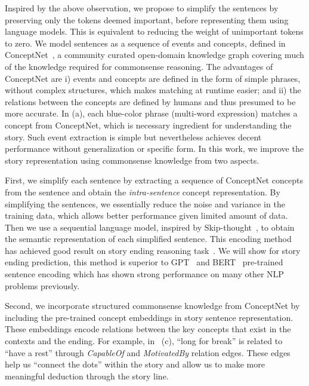 Inspired by the above observation, we propose to simplify the sentences
by preserving only the tokens deemed important, before representing them using
language models. This is equivalent to reducing the weight of unimportant tokens
to zero. 
We model sentences as a sequence of events and concepts, defined in
ConceptNet~\cite{speer2017conceptnet}, a community curated open-domain 
knowledge graph covering much of the knowledge required for commonsense 
reasoning.
The advantages of ConceptNet are i) events and concepts are defined
in the form of simple phrases, without complex structures, 
which makes matching at runtime easier; and ii) the relations
between the concepts are defined by humans and thus presumed  to be
more accurate.
In (a), each blue-color phrase (multi-word expression) 
matches a concept from ConceptNet,
which is necessary ingredient for understanding the story.
Such event extraction is simple but nevertheless achieves 
decent performance without generalization or specific form. 
In this work, we improve the story representation
using commonsense knowledge from two aspects.

First, we simplify each sentence by extracting a sequence of
ConceptNet concepts from the sentence
and obtain the {\em intra-sentence} concept representation.
By simplifying the sentences, we essentially reduce the noise
and variance in the training data, which allows better performance
 given limited amount of data.
Then we use a sequential language model, inspired by
Skip-thought~\cite{kiros2015skip}, to obtain the
semantic representation of each simplified sentence. 
This encoding method has achieved good result on story ending 
reasoning task~\cite{roemmele2017rnn}. 
We will show for story ending prediction, this method is superior 
to GPT~\cite{radford2018improving} and BERT~\cite{devlin2018bert} pre-trained 
sentence encoding which has shown strong performance on many other 
NLP problems previously. 

Second, we incorporate structured commonsense knowledge 
from ConceptNet
by including the pre-trained concept 
embeddings in story sentence representation.  These embeddings encode
relations between the key concepts that exist in the contexts and the ending.
For example, in ~(c),  ``long for break'' is related to ``have a rest''
through {\em CapableOf} and {\em MotivatedBy} relation edges.
These edges help us ``connect the dots'' within the story and allow us
to make more meaningful deduction through the story line.

